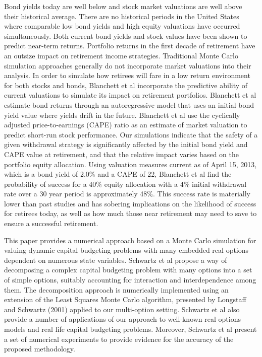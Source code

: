 Bond yields today are well below and stock market valuations are well above their historical average.\cite{Blanchett:2013aa} There are no historical periods in the United States where comparable low bond yields and high equity valuations have occurred simultaneously. Both current bond yields and stock values have been shown to predict near-term returns. Portfolio returns in the first decade of retirement have an outsize impact on retirement income strategies. Traditional Monte Carlo simulation approaches generally do not incorporate market valuations into their analysis. In order to simulate how retirees will fare in a low return environment for both stocks and bonds, Blanchett et al incorporate the predictive ability of current valuations to simulate its impact on retirement portfolios. Blanchett et al estimate bond returns through an autoregressive model that uses an initial bond yield value where yields drift in the future. Blanchett et al use the cyclically adjusted price-to-earnings (CAPE) ratio as an estimate of market valuation to predict short-run stock performance. Our simulations indicate that the safety of a given withdrawal strategy is significantly affected by the initial bond yield and CAPE value at retirement, and that the relative impact varies based on the portfolio equity allocation. Using valuation measures current as of April 15, 2013, which is a bond yield of 2.0\% and a CAPE of 22, Blanchett et al find the probability of success for a 40\% equity allocation with a 4\% initial withdrawal rate over a 30 year period is approximately 48\%. This success rate is materially lower than past studies and has sobering implications on the likelihood of success for retirees today, as well as how much those near retirement may need to save to ensure a successful retirement.

This paper provides a numerical approach based on a Monte Carlo simulation for valuing dynamic capital budgeting problems with many embedded real options dependent on numerous state variables.\cite{Gamba:2003aa} Schwartz et al propose a way of decomposing a complex capital budgeting problem with many options into a set of simple options, suitably accounting for interaction and interdependence among them. The decomposition approach is numerically implemented using an extension of the Least Squares Monte Carlo algorithm, presented by Longstaff and Schwartz (2001) applied to our multi-option setting. Schwartz et al also provide a number of applications of our approach to well-known real options models and real life capital budgeting problems. Moreover, Schwartz et al present a set of numerical experiments to provide evidence for the accuracy of the proposed methodology.